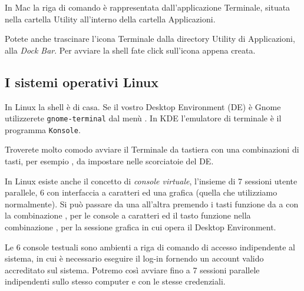 In Mac la riga di comando è rappresentata dall'applicazione \textsf{Terminale},
situata nella cartella Utility all'interno della cartella Applicazioni.

Potete anche trascinare l’icona Terminale dalla directory Utility di
Applicazioni, alla \emph{Dock Bar}. Per avviare la shell fate click sull'icona
appena creata.

\subsection{I sistemi operativi Linux}

In Linux la shell è di casa. Se il vostro Desktop Environment (DE) è Gnome
utilizzerete \texttt{gnome-terminal} dal menù . In KDE l'emulatore di terminale è il programma \texttt{Konsole}.

Troverete molto comodo avviare il Terminale da tastiera con una combinazioni di
tasti, per esempio , da impostare nelle scorciatoie
del DE.

In Linux esiste anche il concetto di \emph{console virtuale}, l'insieme di 7
sessioni utente parallele, 6 con interfaccia a caratteri ed una grafica (quella
che utilizziamo normalmente). Si può passare da una all'altra premendo i tasti
funzione da  a  con la combinazione , per le console a caratteri ed il tasto funzione  nella
combinazione , per la sessione grafica in cui opera
il Desktop Environment.

Le 6 console testuali sono ambienti a riga di comando di accesso indipendente al
sistema, in cui è necessario eseguire il log-in fornendo un account valido
accreditato sul sistema. Potremo così avviare fino a 7 sessioni parallele
indipendenti sullo stesso computer e con le stesse credenziali.








